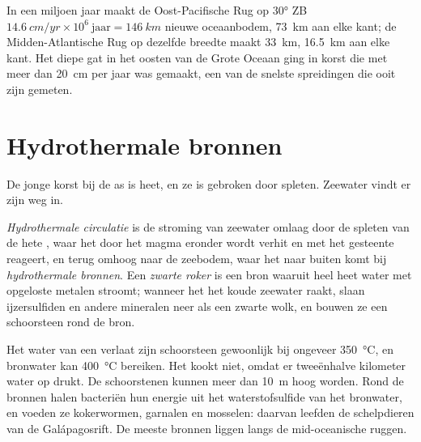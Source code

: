 \begin{example}\label{ex:g11:ocean-ridges:rates}
In een miljoen jaar maakt de Oost-Pacifische Rug op \ang{30} ZB
$\qty{14.6}{cm/yr} \times 10^6\ \text{jaar} = \qty{146}{km}$ nieuwe
oceaanbodem, \qty{73}{km} aan elke kant; de Midden-Atlantische Rug op dezelfde breedte
maakt \qty{33}{km}, \qty{16.5}{km} aan elke kant. Het diepe gat in het oosten van de
Grote Oceaan ging in korst die met meer dan \qty{20}{cm} per jaar was gemaakt, een van
de snelste spreidingen die ooit zijn gemeten.
\end{example}

\section{Hydrothermale bronnen}

De jonge korst bij de as is heet, en ze is gebroken door spleten. Zeewater
vindt er zijn weg in.

\begin{definition}\label{def:g11:ocean-ridges:hydrothermal}
\emph{Hydrothermale circulatie} is de stroming
van zeewater omlaag door de spleten van de hete , waar het door het
magma eronder wordt verhit en met het gesteente reageert, en terug omhoog naar de
zeebodem, waar het naar buiten komt bij \emph{hydrothermale bronnen}. Een \emph{zwarte
roker} is een bron waaruit heel heet water met
opgeloste metalen stroomt; wanneer het het koude zeewater raakt, slaan ijzersulfiden en
andere mineralen neer als een zwarte wolk, en bouwen ze een schoorsteen rond de
bron.
\end{definition}

Het water van een  verlaat zijn schoorsteen gewoonlijk bij ongeveer
\qty{350}{\celsius}, en bronwater kan \qty{400}{\celsius} bereiken. Het kookt niet,
omdat er tweeënhalve kilometer water op drukt. De
schoorstenen kunnen meer dan \qty{10}{m} hoog worden. Rond de bronnen halen bacteriën
hun energie uit het waterstofsulfide van het bronwater, en voeden ze kokerwormen,
garnalen en mosselen: daarvan leefden de schelpdieren van de Galápagosrift. De meeste
bronnen liggen langs de mid-oceanische ruggen.

